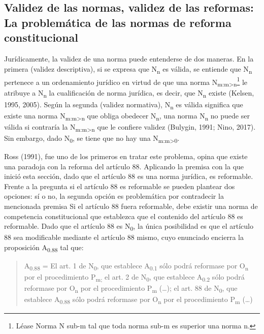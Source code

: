 \documentclass[]{book}
\begin{document}
\begin{refsection}
\section*{Validez de las normas, validez de las reformas: La problemática de las normas de reforma constitucional}

Jurídicamente, la validez de una norma puede entenderse de dos maneras.
En la primera (validez descriptiva), si se expresa que
N\textsubscript{n} es válida, se entiende que N\textsubscript{n}
pertenece a un ordenamiento jurídico en virtud de que una norma
N\textsubscript{m:m\textgreater{}n}\footnote{Léase Norma N sub-m tal que
  toda norma sub-m es superior una norma n.} le atribuye a
N\textsubscript{n} la cualificación de norma jurídica, es decir, que
N\textsubscript{n} existe (Kelsen, 1995, 2005). Según la segunda
(validez normativa), N\textsubscript{n} es válida significa que existe
una norma N\textsubscript{m:m\textgreater{}n} que obliga obedecer
N\textsubscript{n}, una norma N\textsubscript{n} no puede ser válida si
contraría la N\textsubscript{m:m\textgreater{}n} que le confiere validez
(Bulygin, 1991; Nino, 2017). Sin embargo, dado N\textsubscript{0}, se
tiene que no hay una N\textsubscript{m:m\textgreater{}0}.

Ross (1991), fue uno de los primeros en tratar este problema, opina que
existe una paradoja con la reforma del artículo 88. Aplicando la premisa
con la que inició esta sección, dado que el artículo 88 es una norma
jurídica, es reformable. Frente a la pregunta si el artículo 88 es
reformable se pueden plantear dos opciones: sí o no, la segunda opción
es problemática por contradecir la mencionada premisa Si el artículo 88
fuera reformable, debe existir una norma de competencia constitucional
que establezca que el contenido del artículo 88 es reformable. Dado que
el artículo 88 es N\textsubscript{0}, la única posibilidad es que el
artículo 88 sea modificable mediante el artículo 88 mismo, cuyo
enunciado encierra la proposición A\textsubscript{0.88} tal que:

\begin{quote}
A\textsubscript{0.88} = El art. 1 de N\textsubscript{0}, que establece
A\textsubscript{0.1} sólo podrá reformase por O\textsubscript{n} por el
procedimiento P\textsubscript{m;} el art. 2 de N\textsubscript{0}, que
establece A\textsubscript{0.2} sólo podrá reformase por
O\textsubscript{n} por el procedimiento P\textsubscript{m} (\ldots{});
el art. 88 de N\textsubscript{0}, que establece A\textsubscript{0.88}
sólo podrá reformase por O\textsubscript{n} por el procedimiento
P\textsubscript{m} (\ldots{})
\end{quote}


\end{refsection}
\end{document}
